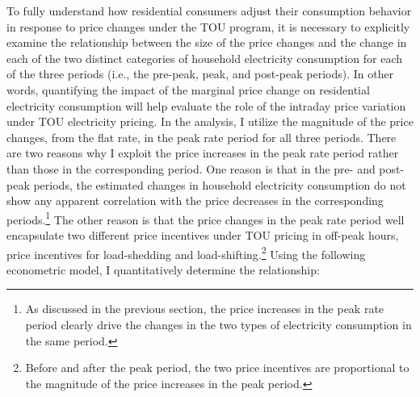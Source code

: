To fully understand how residential consumers adjust their consumption behavior in response to price changes under the TOU program, it is necessary to explicitly examine the relationship between the size of the price changes and the change in each of the two distinct categories of household electricity consumption for each of the three periods (i.e., the pre-peak, peak, and post-peak periods). In other words, quantifying the impact of the marginal price change on residential electricity consumption will help evaluate the role of the intraday price variation under TOU electricity pricing. In the analysis, I utilize the magnitude of the price changes, from the flat rate, in the peak rate period for all three periods. There are two reasons why I exploit the price increases in the peak rate period rather than those in the corresponding period. One reason is that in the pre- and post-peak periods, the estimated changes in household electricity consumption do not show any apparent correlation with the price decreases in the corresponding periods.\footnote{As discussed in the previous section, the price increases in the peak rate period clearly drive the changes in the two types of electricity consumption in the same period.} The other reason is that the price changes in the peak rate period well encapsulate two different price incentives under TOU pricing in off-peak hours, price incentives for load-shedding and load-shifting.\footnote{Before and after the peak period, the two price incentives are proportional to the magnitude of the price increases in the peak period.} Using the following econometric model, I quantitatively determine the relationship:
